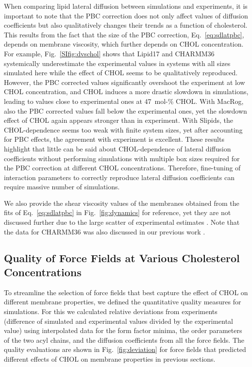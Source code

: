 \documentclass[journal=jctcce]{achemso}
\begin{document}
When comparing lipid lateral diffusion between simulations and experiments, it is important to note that the PBC correction does not only affect values of diffusion coefficients but also qualitatively changes their trends as a function of cholesterol. This results from the fact that the size of the PBC correction, Eq.~\eqref{eq:sdlatpbc}, depends on membrane viscosity, which further depends on CHOL concentration. For example, Fig.~\ref{SIfig:dvschol} shows that Lipid17 and CHARMM36 systemically underestimate the experimental values in systems with all sizes simulated here while the effect of CHOL seems to be qualitatively reproduced. However, the PBC corrected values significantly overshoot the experiment at low CHOL concentration, and CHOL induces a more drastic slowdown in simulations, leading to values close to experimental ones at 47~mol-\% CHOL. With MacRog, also the PBC corrected values fall below the experimental ones, yet the slowdown effect of CHOL again appears stronger than in experiment. With Slipids, the CHOL-dependence seems too weak with finite system sizes, yet after accounting for PBC effects, the agreement with experiment is excellent. These results highlight that little can be said about CHOL-dependence of lateral diffusion coefficients without performing simulations with multiple box sizes required for the PBC correction at different CHOL concentrations. Therefore, fine-tuning of interaction parameters to correctly reproduce lateral diffusion coefficients can require massive number of simulations.

We also provide the shear viscosity values of the membranes obtained from the fits of Eq.~\eqref{eq:sdlatpbc} in Fig.~\ref{fig:dynamics} for reference, yet they are not discussed further due to the large scatter of experimental estimates \cite{faizi2022vesicle}. Note that the data for CHARMM36 was also discussed in our previous work \cite{fabian2023protein}.

\subsection{Quality of Force Fields at Various Cholesterol Concentrations}

To streamline the selection of force fields that best capture the effect of CHOL on different membrane properties, we defined the quantitative quality measures for simulations. For this we calculated  relative deviations from experiments (difference of simulated and experimental values divided by the experimental value) using interpolated data for the form factor minima, the order parameters of the two acyl chains, and the diffusion coefficients from all the force fields. The quality evaluations are shown in Fig.~\ref{fig:deviation} for force fields that predicted different effects of CHOL on membrane properties in previous sections.
\end{document}
